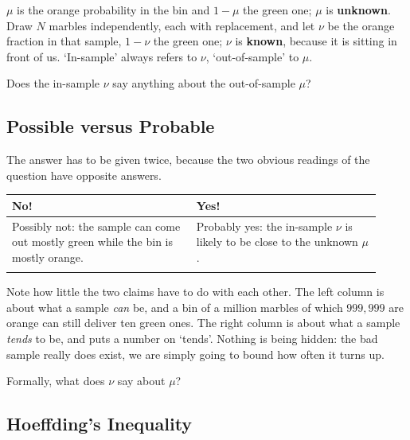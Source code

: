 \begin{notation}\label{not:munu}
    \(\mu\) is the orange probability in the bin and \(1 - \mu\) the green one;
    \(\mu\) is \textbf{unknown}. Draw \(N\) marbles independently, each with
    replacement, and let \(\nu\) be the orange fraction in that sample, \(1 -
    \nu\) the green one; \(\nu\) is \textbf{known}, because it is sitting in
    front of us. `In-sample' always refers to \(\nu\), `out-of-sample' to
    \(\mu\).
\end{notation}

\begin{question}
    Does the in-sample \(\nu\) say anything about the out-of-sample \(\mu\)?
\end{question}

\subsection{Possible versus Probable}

The answer has to be given twice, because the two obvious readings of the
question have opposite answers.

\begin{center}
    \begin{tabular}{@{}p{0.46\linewidth}p{0.46\linewidth}@{}}
        \toprule
        \textbf{No!} & \textbf{Yes!}\\
        \midrule
        Possibly not: the sample can come out mostly green while the bin is
        mostly orange. &
        Probably yes: the in-sample \(\nu\) is likely to be close to the unknown
        \(\mu\).\\
        \addlinespace[3pt]
        \bottomrule
    \end{tabular}
\end{center}

Note how little the two claims have to do with each other. The left column is
about what a sample \emph{can} be, and a bin of a million marbles of which
\(999{,}999\) are orange can still deliver ten green ones. The right column is
about what a sample \emph{tends} to be, and puts a number on `tends'. Nothing is
being hidden: the bad sample really does exist, we are simply going to bound how
often it turns up.

\begin{question}
    Formally, what does \(\nu\) say about \(\mu\)?
\end{question}

\subsection{Hoeffding's Inequality}


